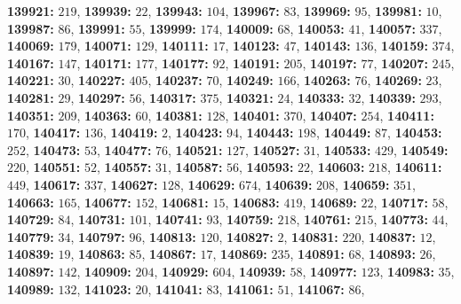 \textsf{\bfseries 139921:} $219$, \textsf{\bfseries 139939:} $22$, \textsf{\bfseries 139943:} $104$, \textsf{\bfseries 139967:} $83$, \textsf{\bfseries 139969:} $95$, \textsf{\bfseries 139981:} $10$, \textsf{\bfseries 139987:} $86$, \textsf{\bfseries 139991:} $55$, \textsf{\bfseries 139999:} $174$, \textsf{\bfseries 140009:} $68$, \textsf{\bfseries 140053:} $41$, \textsf{\bfseries 140057:} $337$, \textsf{\bfseries 140069:} $179$, \textsf{\bfseries 140071:} $129$, \textsf{\bfseries 140111:} $17$, \textsf{\bfseries 140123:} $47$, \textsf{\bfseries 140143:} $136$, \textsf{\bfseries 140159:} $374$, \textsf{\bfseries 140167:} $147$, \textsf{\bfseries 140171:} $177$, \textsf{\bfseries 140177:} $92$, \textsf{\bfseries 140191:} $205$, \textsf{\bfseries 140197:} $77$, \textsf{\bfseries 140207:} $245$, \textsf{\bfseries 140221:} $30$, \textsf{\bfseries 140227:} $405$, \textsf{\bfseries 140237:} $70$, \textsf{\bfseries 140249:} $166$, \textsf{\bfseries 140263:} $76$, \textsf{\bfseries 140269:} $23$, \textsf{\bfseries 140281:} $29$, \textsf{\bfseries 140297:} $56$, \textsf{\bfseries 140317:} $375$, \textsf{\bfseries 140321:} $24$, \textsf{\bfseries 140333:} $32$, \textsf{\bfseries 140339:} $293$, \textsf{\bfseries 140351:} $209$, \textsf{\bfseries 140363:} $60$, \textsf{\bfseries 140381:} $128$, \textsf{\bfseries 140401:} $370$, \textsf{\bfseries 140407:} $254$, \textsf{\bfseries 140411:} $170$, \textsf{\bfseries 140417:} $136$, \textsf{\bfseries 140419:} $2$, \textsf{\bfseries 140423:} $94$, \textsf{\bfseries 140443:} $198$, \textsf{\bfseries 140449:} $87$, \textsf{\bfseries 140453:} $252$, \textsf{\bfseries 140473:} $53$, \textsf{\bfseries 140477:} $76$, \textsf{\bfseries 140521:} $127$, \textsf{\bfseries 140527:} $31$, \textsf{\bfseries 140533:} $429$, \textsf{\bfseries 140549:} $220$, \textsf{\bfseries 140551:} $52$, \textsf{\bfseries 140557:} $31$, \textsf{\bfseries 140587:} $56$, \textsf{\bfseries 140593:} $22$, \textsf{\bfseries 140603:} $218$, \textsf{\bfseries 140611:} $449$, \textsf{\bfseries 140617:} $337$, \textsf{\bfseries 140627:} $128$, \textsf{\bfseries 140629:} $674$, \textsf{\bfseries 140639:} $208$, \textsf{\bfseries 140659:} $351$, \textsf{\bfseries 140663:} $165$, \textsf{\bfseries 140677:} $152$, \textsf{\bfseries 140681:} $15$, \textsf{\bfseries 140683:} $419$, \textsf{\bfseries 140689:} $22$, \textsf{\bfseries 140717:} $58$, \textsf{\bfseries 140729:} $84$, \textsf{\bfseries 140731:} $101$, \textsf{\bfseries 140741:} $93$, \textsf{\bfseries 140759:} $218$, \textsf{\bfseries 140761:} $215$, \textsf{\bfseries 140773:} $44$, \textsf{\bfseries 140779:} $34$, \textsf{\bfseries 140797:} $96$, \textsf{\bfseries 140813:} $120$, \textsf{\bfseries 140827:} $2$, \textsf{\bfseries 140831:} $220$, \textsf{\bfseries 140837:} $12$, \textsf{\bfseries 140839:} $19$, \textsf{\bfseries 140863:} $85$, \textsf{\bfseries 140867:} $17$, \textsf{\bfseries 140869:} $235$, \textsf{\bfseries 140891:} $68$, \textsf{\bfseries 140893:} $26$, \textsf{\bfseries 140897:} $142$, \textsf{\bfseries 140909:} $204$, \textsf{\bfseries 140929:} $604$, \textsf{\bfseries 140939:} $58$, \textsf{\bfseries 140977:} $123$, \textsf{\bfseries 140983:} $35$, \textsf{\bfseries 140989:} $132$, \textsf{\bfseries 141023:} $20$, \textsf{\bfseries 141041:} $83$, \textsf{\bfseries 141061:} $51$, \textsf{\bfseries 141067:} $86$, 
